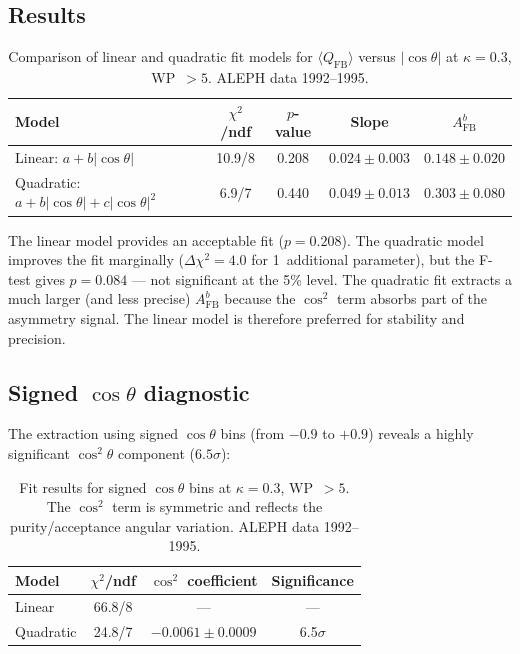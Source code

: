 \documentclass[11pt,a4paper]{article}
\begin{document}
\subsection{Results}

\begin{table}[htbp]
\centering
\caption{Comparison of linear and quadratic fit models for
  $\langle Q_\mathrm{FB} \rangle$ versus $|\cos\theta|$ at
  $\kappa = 0.3$, WP~$> 5$.  ALEPH data 1992--1995.}
\label{tbl:angular-fit}
\begin{tabular}{lcccc}
\toprule
Model & $\chi^2$/ndf & $p$-value & Slope & $A_\mathrm{FB}^b$ \\
\midrule
Linear: $a + b|\cos\theta|$ & 10.9/8 & 0.208 & $0.024 \pm 0.003$ & $0.148 \pm 0.020$ \\
Quadratic: $a + b|\cos\theta| + c|\cos\theta|^2$ & 6.9/7 & 0.440 & $0.049 \pm 0.013$ & $0.303 \pm 0.080$ \\
\bottomrule
\end{tabular}
\end{table}

The linear model provides an acceptable fit ($p = 0.208$).  The quadratic
model improves the fit marginally ($\Delta\chi^2 = 4.0$ for 1~additional
parameter), but the F-test gives $p = 0.084$ --- not significant at
the 5\% level.  The quadratic fit extracts a much larger (and less precise)
$A_\mathrm{FB}^b$ because the $\cos^2$ term absorbs part of the asymmetry
signal.  The linear model is therefore preferred for stability and precision.

\subsection{Signed $\cos\theta$ diagnostic}

The extraction using signed $\cos\theta$ bins (from $-0.9$ to $+0.9$)
reveals a highly significant $\cos^2\theta$ component ($6.5\sigma$):

\begin{table}[htbp]
\centering
\caption{Fit results for signed $\cos\theta$ bins at $\kappa = 0.3$,
  WP~$> 5$.  The $\cos^2$ term is symmetric and reflects the
  purity/acceptance angular variation.  ALEPH data 1992--1995.}
\label{tbl:signed-cos-fit}
\begin{tabular}{lccc}
\toprule
Model & $\chi^2$/ndf & $\cos^2$ coefficient & Significance \\
\midrule
Linear & 66.8/8 & --- & --- \\
Quadratic & 24.8/7 & $-0.0061 \pm 0.0009$ & 6.5$\sigma$ \\
\bottomrule
\end{tabular}
\end{table}
\end{document}
